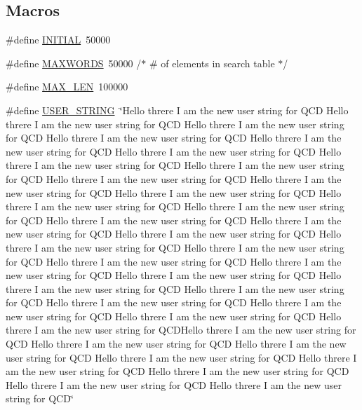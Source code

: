 \subsection*{Macros}
\begin{DoxyCompactItemize}
\item 
\#define \mbox{\hyperlink{adat-devel_2other__libs_2filedb_2filehash_2tcreate_8c_aa3d063564f6ab16f6d408b8369d0e9ff}{I\+N\+I\+T\+I\+AL}}~50000
\item 
\#define \mbox{\hyperlink{adat-devel_2other__libs_2filedb_2filehash_2tcreate_8c_aa6b319146daf33409da1bbe4194553dc}{M\+A\+X\+W\+O\+R\+DS}}~50000             /$\ast$ \# of elements in search table $\ast$/
\item 
\#define \mbox{\hyperlink{adat-devel_2other__libs_2filedb_2filehash_2tcreate_8c_aabf4f709c8199e41cf279c77112345fe}{M\+A\+X\+\_\+\+L\+EN}}~100000
\item 
\#define \mbox{\hyperlink{adat-devel_2other__libs_2filedb_2filehash_2tcreate_8c_a5fdc86a0c07ccece3ef65e2f46c0ffd4}{U\+S\+E\+R\+\_\+\+S\+T\+R\+I\+NG}}~\char`\"{}Hello threre I am the new user string for Q\+CD Hello threre I am the new user string for Q\+CD Hello threre I am the new user string for Q\+CD Hello threre I am the new user string for Q\+CD Hello threre I am the new user string for Q\+CD Hello threre I am the new user string for Q\+CD Hello threre I am the new user string for Q\+CD Hello threre I am the new user string for Q\+CD Hello threre I am the new user string for Q\+CD Hello threre I am the new user string for Q\+CD Hello threre I am the new user string for Q\+CD Hello threre I am the new user string for Q\+CD Hello threre I am the new user string for Q\+CD Hello threre I am the new user string for Q\+CD Hello threre I am the new user string for Q\+CD Hello threre I am the new user string for Q\+CD Hello threre I am the new user string for Q\+CD Hello threre I am the new user string for Q\+CD Hello threre I am the new user string for Q\+CD Hello threre I am the new user string for Q\+CD Hello threre I am the new user string for Q\+CD Hello threre I am the new user string for Q\+CD Hello threre I am the new user string for Q\+CD Hello threre I am the new user string for Q\+CD Hello threre I am the new user string for Q\+CD Hello threre I am the new user string for Q\+CD Hello threre I am the new user string for Q\+C\+D\+Hello threre I am the new user string for Q\+CD  Hello threre I am the new user string for Q\+CD Hello threre I am the new user string for Q\+CD Hello threre I am the new user string for Q\+CD Hello threre I am the new user string for Q\+CD Hello threre I am the new user string for Q\+CD Hello threre I am the new user string for Q\+CD Hello threre I am the new user string for Q\+CD\char`\"{}
\end{DoxyCompactItemize}
